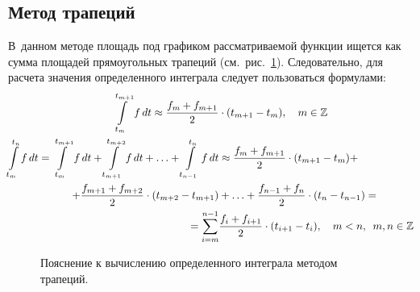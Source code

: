 \documentclass[12pt,a4paper,openany]{extarticle}
\begin{document}
\subsection{Метод трапеций}
\hspace*{\parindent}В~данном методе площадь под графиком рассматриваемой функции ищется как сумма площадей прямоугольных трапеций (см.~рис.~\ref{fig:trapezoid_method}).
Следовательно, для расчета значения определенного интеграла следует пользоваться формулами:
\begin{align}
\int\limits_{t_m}^{t_{m+1}} f\,dt \approx \dfrac{f_m+f_{m+1}}{2}&\cdot(t_{m+1}-t_m), \quad m\in\mathbb{Z}\\
\int\limits_{t_m}^{t_{n}} f\,dt = \int\limits_{t_m}^{t_{m+1}} f\,dt + \int\limits_{t_{m+1}}^{t_{m+2}} f\,dt + \ldots + \int\limits_{t_{n-1}}^{t_{n}} f\,dt &\approx  \dfrac{f_m+f_{m+1}}{2}\cdot(t_{m+1}-t_m) + \notag \\ + \dfrac{f_{m+1}+f_{m+2}}{2}\cdot(t_{m+2}-t_{m+1}) &+ \ldots + \dfrac{f_{n-1}+f_{n}}{2}\cdot(t_{n}-t_{n-1}) =\notag \\= \sum\limits_{i=m}^{n-1}&\dfrac{f_{i}+f_{i+1}}{2}\cdot(t_{i+1}-t_{i}), \quad m<n, \;\: m,n\in\mathbb{Z}
\end{align}

\begin{figure}[h!]
	\caption{Пояснение к вычислению определенного интеграла методом трапеций.}
	\label{fig:trapezoid_method}
\end{figure}
\end{document}
